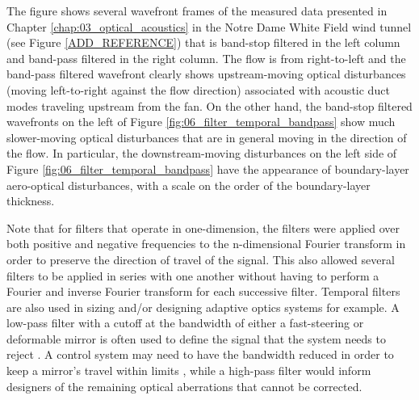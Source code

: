 The figure shows several wavefront frames of the measured data presented in Chapter \ref{chap:03_optical_acoustics} in the Notre Dame White Field wind tunnel (see Figure \ref{ADD_REFERENCE}) that is band-stop filtered in the left column and band-pass filtered in the right column.
The flow is from right-to-left and the band-pass filtered wavefront clearly shows upstream-moving optical disturbances (moving left-to-right against the flow direction) associated with acoustic duct modes traveling upstream from the fan.
On the other hand, the band-stop filtered wavefronts on the left of Figure \ref{fig:06_filter_temporal_bandpass} show much slower-moving optical disturbances that are in general moving in the direction of the flow.
In particular, the downstream-moving disturbances on the left side of Figure \ref{fig:06_filter_temporal_bandpass} have the appearance of boundary-layer aero-optical disturbances, with a scale on the order of the boundary-layer thickness.

Note that for filters that operate in one-dimension, the filters were applied over both positive and negative frequencies to the n-dimensional Fourier transform in order to preserve the direction of travel of the signal.
This also allowed several filters to be applied in series with one another without having to perform a Fourier and inverse Fourier transform for each successive filter.
Temporal filters are also used in sizing and/or designing adaptive optics systems \cite{ADD_SOURCE} for example.
A low-pass filter with a cutoff at the bandwidth of either a fast-steering or deformable mirror is often used to define the signal that the system needs to reject \cite{ADD_SOURCE}.
A control system may need to have the bandwidth reduced in order to keep a mirror’s travel within limits \cite{ADD_SOURCE}, while a high-pass filter would inform designers of the remaining optical aberrations that cannot be corrected.



